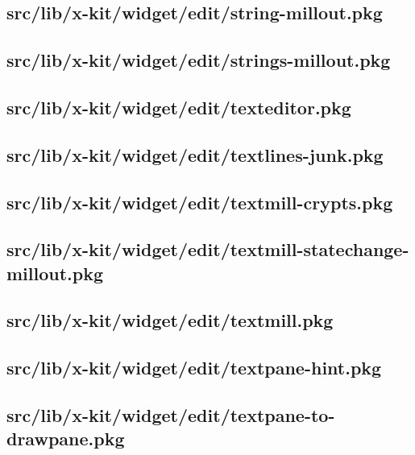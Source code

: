\subsection{src/lib/x-kit/widget/edit/string-millout.pkg}


\subsection{src/lib/x-kit/widget/edit/strings-millout.pkg}


\subsection{src/lib/x-kit/widget/edit/texteditor.pkg}


\subsection{src/lib/x-kit/widget/edit/textlines-junk.pkg}


\subsection{src/lib/x-kit/widget/edit/textmill-crypts.pkg}


\subsection{src/lib/x-kit/widget/edit/textmill-statechange-millout.pkg}


\subsection{src/lib/x-kit/widget/edit/textmill.pkg}


\subsection{src/lib/x-kit/widget/edit/textpane-hint.pkg}


\subsection{src/lib/x-kit/widget/edit/textpane-to-drawpane.pkg}



